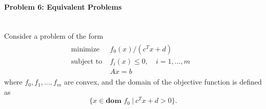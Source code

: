 \documentclass[a4paper]{article}
\begin{document}
\paragraph{Problem 6: Equivalent Problems}
~\\
Consider a problem of the form
\begin{gather}
\label{quasi}
\begin{matrix}
\text{minimize~~} & f_0(x)/\left(c^Tx+d\right)\quad\quad\quad~\\
\text{subject to} & f_i(x)\leq0,\quad i=1,\dots,m\\
&Ax=b\quad\quad\quad\quad\quad\quad\quad~~
\end{matrix}
\end{gather}
where $f_0,f_1,\dots,f_m$ are convex, and the domain of the objective function is defined as \[\{x\in\textbf{dom } f_0 ~|~c^Tx+d>0\}.\]
\end{document}
